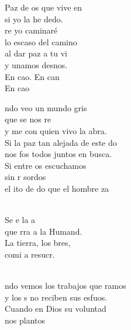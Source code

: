 \documentclass[12pt]{article}
\begin{document}
\begin{multicols*}{2}
\begin{cancion}
	Paz de os que vive en  \\
	si yo la he dedo.\\
\jump
	re yo caminaré \\
	lo escaso del camino\\
	al dar  paz a tu vi \\
	y unamos desnos.\\
\jump
	En cao. En can\\
	En cao\\
\end{cancion}%

\begin{cancion}%
	ndo veo un mundo gris \\
	que se nos re\\
	y me  con quien vivo la abra.\\
	Si la paz tan alejada de este do\\
	nos fos todos juntos en busca.\\
	Si entre os escuchamos \\
	sin r sordos\\
	el ito de do que el hombre za\\\jump\\
	\begin{chorus}%
	Se e la a\\
	que rra a la Humand.\\
	La tierra, los bres,\\
	comi a resucr.\\
	\end{chorus}%
	\jump\\
	ndo vemos los trabajos que ramos\\
	y los s no reciben sus esfuos.\\
Cuando en Dios su voluntad \\
	nos plantos\\

\end{cancion}
\end{multicols*}
\end{document}
